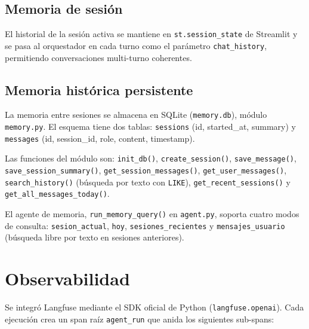 \documentclass[conference]{IEEEtran}
\begin{document}
\subsection{Memoria de sesión}

El historial de la sesión activa se mantiene en \texttt{st.session\_state} de Streamlit y se pasa al orquestador en cada turno como el parámetro \texttt{chat\_history}, permitiendo conversaciones multi-turno coherentes.

\subsection{Memoria histórica persistente}

La memoria entre sesiones se almacena en SQLite (\texttt{memory.db}), módulo \texttt{memory.py}. El esquema tiene dos tablas: \texttt{sessions} (id, started\_at, summary) y \texttt{messages} (id, session\_id, role, content, timestamp).

Las funciones del módulo son: \texttt{init\_db()}, \texttt{create\_session()}, \texttt{save\_message()}, \texttt{save\_session\_summary()}, \texttt{get\_session\_messages()}, \texttt{get\_user\_messages()}, \texttt{search\_history()} (búsqueda por texto con \texttt{LIKE}), \texttt{get\_recent\_sessions()} y \texttt{get\_all\_messages\_today()}.

El agente de memoria, \texttt{run\_memory\_query()} en \texttt{agent.py}, soporta cuatro modos de consulta: \texttt{sesion\_actual}, \texttt{hoy}, \texttt{sesiones\_recientes} y \texttt{mensajes\_usuario} (búsqueda libre por texto en sesiones anteriores).

\section{Observabilidad}

Se integró Langfuse mediante el SDK oficial de Python (\texttt{langfuse.openai}). Cada ejecución crea un span raíz \texttt{agent\_run} que anida los siguientes sub-spans:
\end{document}
